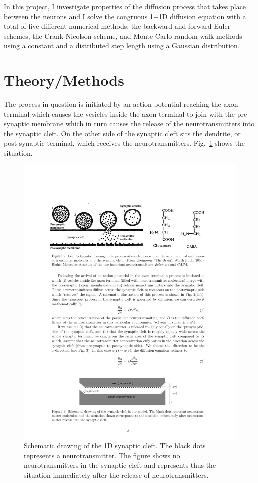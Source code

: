 \documentclass[twoside, 11pt]{article}
\begin{document}
	In this project, I investigate properties of the diffusion process that takes place between the neurons and I solve the congruous 1+1D diffusion equation with a total of five different numerical methods: the backward and forward Euler schemes, the Crank-Nicolson scheme, and Monte Carlo random walk methods using a constant and a distributed step length using a Gaussian distribution.

\section{Theory/Methods}
	The process in question is initiated by an action potential reaching the axon terminal which causes the vesicles inside the axon terminal to join with the pre-synaptic membrane which in turn causes the release of the neurotransmitters into the synaptic cleft. On the other side of the synaptic cleft sits the dendrite, or post-synaptic terminal, which receives the neurotransmitters. Fig.~\ref{fig: synaptic cleft schematic} shows the situation.
	\begin{figure}
		\centering
		\includegraphics[scale=1]{Figures/synaptic_cleft.pdf}
		\caption{Schematic drawing of the 1D synaptic cleft. The black dots represents a neurotransmitter. The figure shows no neurotransmitters in the synaptic cleft and represents thus the situation immediately after the release of neurotransmitters.}
		\label{fig: synaptic cleft schematic}
	\end{figure}
	
\end{document}
